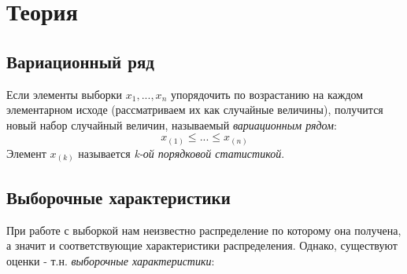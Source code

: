 \documentclass[12pt,a4paper]{article}
\begin{document}
\section{Теория}
\subsection{Вариационный ряд}
Если элементы выборки $x_1, ..., x_n$ упорядочить по возрастанию на каждом элементарном исходе (рассматриваем их как случайные величины), получится новый набор случайный величин, называемый \textit{вариационным рядом}:
$$x_{(1)} \leq ... \leq x_{(n)}$$ Элемент $x_{(k)}$ называется \textit{k-ой порядковой статистикой}.

\subsection{Выборочные характеристики}
При работе с выборкой нам неизвестно распределение по которому она получена, а значит и соответствующие характеристики распределения. Однако, существуют оценки - т.н. \textit{выборочные характеристики}:
\end{document}
